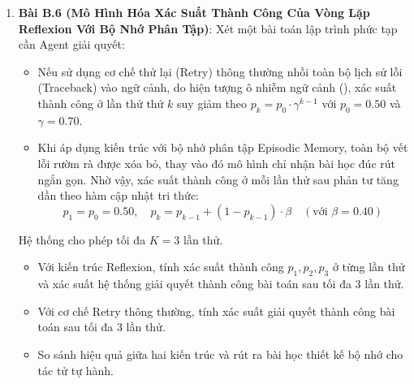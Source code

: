 \begin{enumerate}
  \item \textbf{Bài B.6 (Mô Hình Hóa Xác Suất Thành Công Của Vòng Lặp Reflexion Với Bộ Nhớ Phân Tập)}:
  Xét một bài toán lập trình phức tạp cần Agent giải quyết:
  \begin{itemize}
    \item Nếu sử dụng cơ chế thử lại (Retry) thông thường nhồi toàn bộ lịch sử lỗi (Traceback) vào ngữ cảnh, do hiện tượng ô nhiễm ngữ cảnh (), xác suất thành công ở lần thử thứ $k$ suy giảm theo $p_k = p_0 \cdot \gamma^{k-1}$ với $p_0 = 0.50$ và $\gamma = 0.70$.
    \item Khi áp dụng kiến trúc  với bộ nhớ phân tập Episodic Memory, toàn bộ vết lỗi rườm rà được xóa bỏ, thay vào đó mô hình chỉ nhận bài học đúc rút ngắn gọn. Nhờ vậy, xác suất thành công ở mỗi lần thử sau phản tư tăng dần theo hàm cập nhật tri thức:
    \begin{equation*}
    p_1 = p_0 = 0.50, \quad p_k = p_{k-1} + (1 - p_{k-1}) \cdot \beta \quad (\text{với } \beta = 0.40)
    \end{equation*}
  \end{itemize}
  Hệ thống cho phép tối đa $K = 3$ lần thử.
  \begin{itemize}
    \item[a)] Với kiến trúc Reflexion, tính xác suất thành công $p_1, p_2, p_3$ ở từng lần thử và xác suất hệ thống giải quyết thành công bài toán sau tối đa 3 lần thử.
    \item[b)] Với cơ chế Retry thông thường, tính xác suất giải quyết thành công bài toán sau tối đa 3 lần thử.
    \item[c)] So sánh hiệu quả giữa hai kiến trúc và rút ra bài học thiết kế bộ nhớ cho tác tử tự hành.
  \end{itemize}
\end{enumerate}

